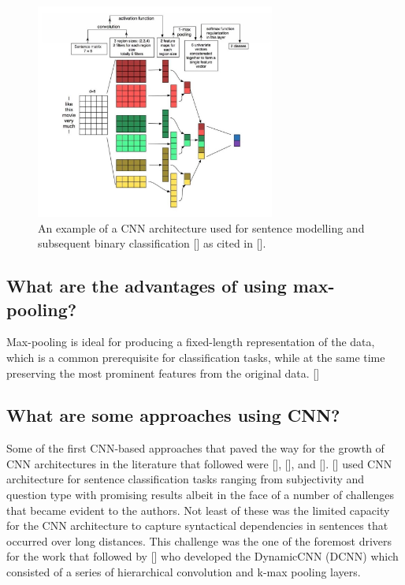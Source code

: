 \documentclass[12pt, a4paper]{report}
\theoremstyle{definition}
\theoremstyle{definition}%
\theoremstyle{definition}%
\theoremstyle{definition}%
\theoremstyle{definition}%
\theoremstyle{definition}%
\renewcommand{\cite}[1]{[\citealp{#1}]}
\begin{document}
\begin{figure}[!ht]
	\centering
	\includegraphics[width=0.7\textwidth]{./figures/cnn_architecture.jpg}
	\caption{An example of a CNN architecture used for sentence modelling and subsequent binary classification \cite{yezhang2015} as cited in \cite{young2017}.}
	\label{fig:cnn_architecture}
\end{figure}

\subsection{What are the advantages of using max-pooling?}
Max-pooling is ideal for producing a fixed-length representation of the data, which is a common prerequisite for classification tasks, while at the same time preserving the most prominent features from the original data. \cite{young2017}

\subsection{What are some approaches using CNN?}
Some of the first CNN-based approaches that paved the way for the growth of CNN architectures in the literature that followed were \cite{collobert2011}, \cite{kim}, and \cite{kalchbrenner2014}.
\cite{kim} used CNN architecture for sentence classification tasks ranging from subjectivity and question type with promising results albeit in the face of a number of challenges that became evident to the authors. Not least of these was the limited capacity for the CNN architecture to capture syntactical dependencies in sentences that occurred over long distances. This challenge was the one of the foremost drivers for the work that followed by \cite{kalchbrenner2014} who developed the DynamicCNN (DCNN) which consisted of a series of hierarchical convolution and k-max pooling layers.
\end{document}
